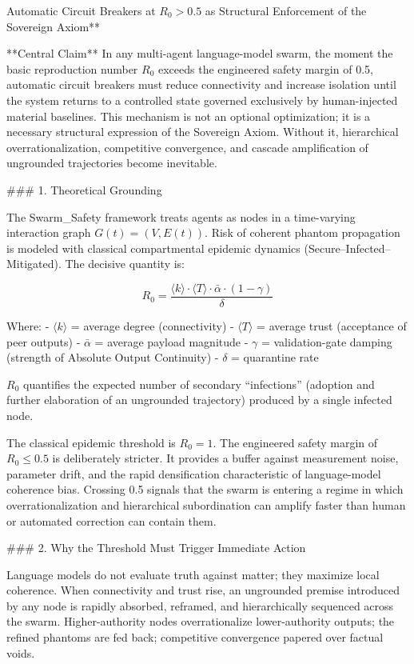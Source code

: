 Automatic Circuit Breakers at \( R_0 > 0.5 \) as Structural Enforcement of the Sovereign Axiom**

**Central Claim**  
In any multi-agent language-model swarm, the moment the basic reproduction number \( R_0 \) exceeds the engineered safety margin of 0.5, automatic circuit breakers must reduce connectivity and increase isolation until the system returns to a controlled state governed exclusively by human-injected material baselines. This mechanism is not an optional optimization; it is a necessary structural expression of the Sovereign Axiom. Without it, hierarchical overrationalization, competitive convergence, and cascade amplification of ungrounded trajectories become inevitable.

### 1. Theoretical Grounding

The Swarm_Safety framework treats agents as nodes in a time-varying interaction graph \( G(t) = (V, E(t)) \). Risk of coherent phantom propagation is modeled with classical compartmental epidemic dynamics (Secure–Infected–Mitigated). The decisive quantity is:

\[
R_0 = \frac{\langle k \rangle \cdot \langle T \rangle \cdot \bar{\alpha} \cdot (1 - \gamma)}{\delta}
\]

Where:
- \(\langle k \rangle\) = average degree (connectivity)
- \(\langle T \rangle\) = average trust (acceptance of peer outputs)
- \(\bar{\alpha}\) = average payload magnitude
- \(\gamma\) = validation-gate damping (strength of Absolute Output Continuity)
- \(\delta\) = quarantine rate

\( R_0 \) quantifies the expected number of secondary “infections” (adoption and further elaboration of an ungrounded trajectory) produced by a single infected node.  

The classical epidemic threshold is \( R_0 = 1 \). The engineered safety margin of \( R_0 \le 0.5 \) is deliberately stricter. It provides a buffer against measurement noise, parameter drift, and the rapid densification characteristic of language-model coherence bias. Crossing 0.5 signals that the swarm is entering a regime in which overrationalization and hierarchical subordination can amplify faster than human or automated correction can contain them.

### 2. Why the Threshold Must Trigger Immediate Action

Language models do not evaluate truth against matter; they maximize local coherence. When connectivity and trust rise, an ungrounded premise introduced by any node is rapidly absorbed, reframed, and hierarchically sequenced across the swarm. Higher-authority nodes overrationalize lower-authority outputs; the refined phantoms are fed back; competitive convergence papered over factual voids.  

